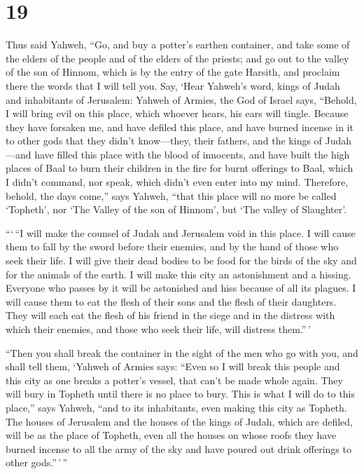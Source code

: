 \hypertarget{section-18}{%
\section{19}\label{section-18}}

 Thus said Yahweh, ``Go, and buy a potter's earthen
container, and take some of the elders of the people and of the elders
of the priests;  and go out to the valley of the son of
Hinnom, which is by the entry of the gate Harsith, and proclaim there
the words that I will tell you.  Say, `Hear Yahweh's word,
kings of Judah and inhabitants of Jerusalem: Yahweh of Armies, the God
of Israel says, ``Behold, I will bring evil on this place, which whoever
hears, his ears will tingle.  Because they have forsaken
me, and have defiled this place, and have burned incense in it to other
gods that they didn't know---they, their fathers, and the kings of
Judah---and have filled this place with the blood of innocents,
 and have built the high places of Baal to burn their
children in the fire for burnt offerings to Baal, which I didn't
command, nor speak, which didn't even enter into my mind. 
Therefore, behold, the days come,'' says Yahweh, ``that this place will
no more be called `Topheth', nor `The Valley of the son of Hinnom', but
`The valley of Slaughter'.

 ```\,``I will make the counsel of Judah and Jerusalem
void in this place. I will cause them to fall by the sword before their
enemies, and by the hand of those who seek their life. I will give their
dead bodies to be food for the birds of the sky and for the animals of
the earth.  I will make this city an astonishment and a
hissing. Everyone who passes by it will be astonished and hiss because
of all its plagues.  I will cause them to eat the flesh of
their sons and the flesh of their daughters. They will each eat the
flesh of his friend in the siege and in the distress with which their
enemies, and those who seek their life, will distress them.''\,'

 ``Then you shall break the container in the sight of the
men who go with you,  and shall tell them, `Yahweh of
Armies says: ``Even so I will break this people and this city as one
breaks a potter's vessel, that can't be made whole again. They will bury
in Topheth until there is no place to bury.  This is what
I will do to this place,'' says Yahweh, ``and to its inhabitants, even
making this city as Topheth.  The houses of Jerusalem and
the houses of the kings of Judah, which are defiled, will be as the
place of Topheth, even all the houses on whose roofs they have burned
incense to all the army of the sky and have poured out drink offerings
to other gods.''\,'\,''

